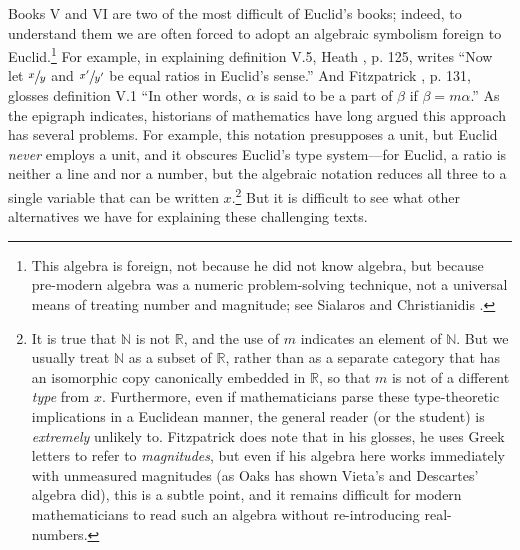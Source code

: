 \documentclass[11pt]{article}
\begin{document}
Books V and VI are two of the most difficult of Euclid's books; indeed, to understand them we are often forced to adopt an algebraic symbolism foreign to Euclid.\footnote{This algebra is foreign, not because he did not know algebra, but because pre-modern algebra was a numeric problem-solving technique, not a universal means of treating number and magnitude; see Sialaros and Christianidis  \citep{SialarosChristianidis2016}.} For example, in explaining definition V.5, Heath \citep{Heath1908ElementsVol2}, p. 125, writes ``Now let \( \sfrac{x}{y} \) and \( \sfrac{x'}{y'} \) be equal ratios in Euclid's sense.'' And Fitzpatrick \citep{Fitzpatrick2008Euclid}, p. 131, glosses definition V.1 ``In other words, \( \alpha\) is said to be a part of \(\beta\) if \(\beta = m\alpha\).'' As the epigraph indicates, historians of mathematics have long argued this approach has several problems. For example, this notation presupposes a unit, but Euclid \textit{never} employs a unit, and it obscures Euclid's type system---for Euclid, a ratio is neither a line and nor a number, but the algebraic notation reduces all three to a single variable that can be written \(x\).\footnote{It is true that \( \mathbb{N} \) is not \( \mathbb{R} \), and the use of \(m\) indicates an element of \(\mathbb{N} \). But we usually treat \(\mathbb{N} \) as a subset of \(\mathbb{R}\), rather than as a separate category that has an isomorphic copy canonically embedded in \(\mathbb{R}\), so that \(m\) is not of a different \textit{type} from \(x\). Furthermore, even if mathematicians parse these type-theoretic implications in a Euclidean manner, the general reader (or the student) is \textit{extremely} unlikely to. Fitzpatrick does note that in his glosses, he uses Greek letters to refer to \textit{magnitudes}, but even if his algebra here works immediately with unmeasured magnitudes (as Oaks \citep{Oaks2022} has shown Vieta's and Descartes' algebra did), this is a subtle point, and it remains difficult for modern mathematicians to read such an algebra without re-introducing real-numbers.} But it is difficult to see what other alternatives we have for explaining these challenging texts.
\end{document}
